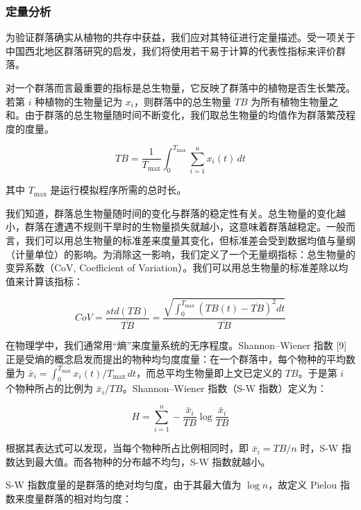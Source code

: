 \documentclass[11pt,a4paper]{ctexart}
\begin{document}
\subsubsection{定量分析}

为验证群落确实从植物的共存中获益，我们应对其特征进行定量描述。受一项关于中国西北地区群落研究的启发，我们将使用若干易于计算的代表性指标来评价群落。

对一个群落而言最重要的指标是总生物量，它反映了群落中的植物是否生长繁茂。若第 $i$ 种植物的生物量记为 $x_i$，则群落中的总生物量 $TB$ 为所有植物生物量之和。由于群落的总生物量随时间不断变化，我们取总生物量的均值作为群落繁茂程度的度量。

\begin{equation}
TB=\frac{1}{T_{\max}}\int_{0}^{T_{\max}}\sum_{i=1}^{n}x_i(t)\,dt
\label{eq:tb}
\end{equation}

其中 $T_{\max}$ 是运行模拟程序所需的总时长。

我们知道，群落总生物量随时间的变化与群落的稳定性有关。总生物量的变化越小，群落在遭遇不规则干旱时的生物量损失就越小，这意味着群落越稳定。一般而言，我们可以用总生物量的标准差来度量其变化，但标准差会受到数据均值与量纲（计量单位）的影响。为消除这一影响，我们定义了一个无量纲指标：总生物量的变异系数（CoV, Coefficient of Variation）。我们可以用总生物量的标准差除以均值来计算该指标：

\begin{equation}
CoV=\frac{std(TB)}{\overline{TB}}
=\frac{\sqrt{\int_{0}^{T_{\max}}\left(TB(t)-\overline{TB}\right)^{2}dt}}{\overline{TB}}
\label{eq:cov}
\end{equation}

在物理学中，我们通常用“熵”来度量系统的无序程度。Shannon--Wiener 指数 [9] 正是受熵的概念启发而提出的物种均匀度度量：在一个群落中，每个物种的平均数量为 $\bar{x}_i=\int_{0}^{T_{\max}}x_i(t)/T_{\max}\,dt$，而总平均生物量即上文已定义的 $TB$。于是第 $i$ 个物种所占的比例为 $\bar{x}_i/TB$。Shannon--Wiener 指数（S-W 指数）定义为：

\begin{equation}
H=\sum_{i=1}^{n}-\frac{\bar{x}_i}{TB}\log\frac{\bar{x}_i}{TB}
\label{eq:sw}
\end{equation}

根据其表达式可以发现，当每个物种所占比例相同时，即 $\bar{x}_i=TB/n$ 时，S-W 指数达到最大值。而各物种的分布越不均匀，S-W 指数就越小。

S-W 指数度量的是群落的绝对均匀度，由于其最大值为 $\log n$，故定义 Pielou 指数来度量群落的相对均匀度：
\end{document}
